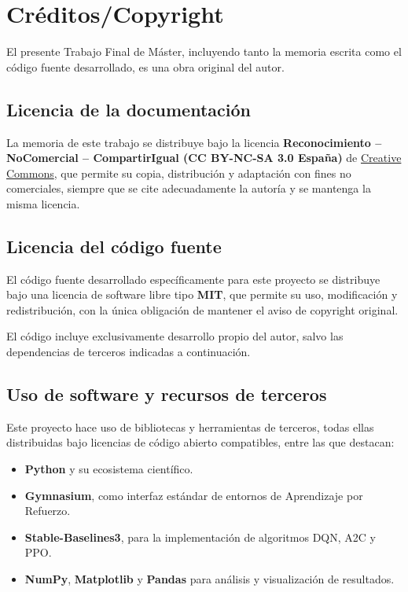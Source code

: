 \hypersetup{pageanchor=false}
\setcounter{page}{1} 
\pagestyle{plain}

\chapter*{Créditos/Copyright}

El presente Trabajo Final de Máster, incluyendo tanto la memoria escrita como el código fuente desarrollado, es una obra original del autor.

\section*{Licencia de la documentación}

La memoria de este trabajo se distribuye bajo la licencia 
\textbf{Reconocimiento -- NoComercial -- CompartirIgual (CC BY-NC-SA 3.0 España)} de 
\href{https://creativecommons.org/licenses/by-nc-sa/3.0/es/}{Creative Commons}, 
que permite su copia, distribución y adaptación con fines no comerciales, siempre que se cite adecuadamente la autoría y se mantenga la misma licencia.

\section*{Licencia del código fuente}

El código fuente desarrollado específicamente para este proyecto se distribuye bajo una licencia de software libre tipo \textbf{MIT}, que permite su uso, modificación y redistribución, con la única obligación de mantener el aviso de copyright original.

El código incluye exclusivamente desarrollo propio del autor, salvo las dependencias de terceros indicadas a continuación.

\section*{Uso de software y recursos de terceros}

Este proyecto hace uso de bibliotecas y herramientas de terceros, todas ellas distribuidas bajo licencias de código abierto compatibles, entre las que destacan:

\begin{itemize}
    \item \textbf{Python} y su ecosistema científico.
    \item \textbf{Gymnasium}, como interfaz estándar de entornos de Aprendizaje por Refuerzo.
    \item \textbf{Stable-Baselines3}, para la implementación de algoritmos DQN, A2C y PPO.
    \item \textbf{NumPy}, \textbf{Matplotlib} y \textbf{Pandas} para análisis y visualización de resultados.
\end{itemize}

